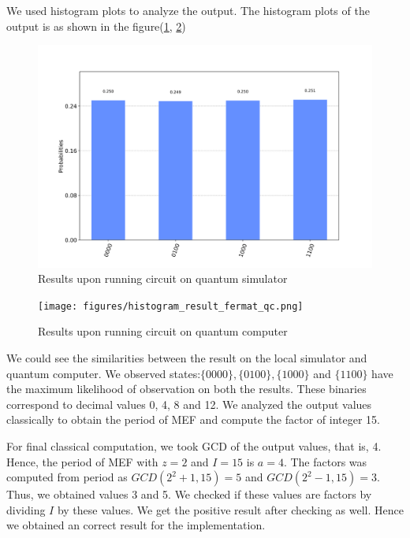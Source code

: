 We used histogram plots to analyze the output. The histogram plots of the output is as shown in the figure(\ref{fig: simulator result}, \ref{fig: quantum result})

\begin{figure}[ht]
    \centering
    \includegraphics[width=\linewidth]{figures/histogram_result_fermat_sim.png}
  \caption{Results upon running circuit on quantum simulator }
  \label{fig: simulator result}
\end{figure}
\begin{figure}[ht]
    \centering
    \texttt{[image: figures/histogram\_result\_fermat\_qc.png]}
  \caption{Results upon running circuit on quantum computer}
  \label{fig: quantum result}
\end{figure}

We could see the similarities between the result on the local simulator and quantum computer. We observed states:$\{0000\},\{0100\},\{1000\}$ and $\{1100\}$ have the maximum likelihood of observation on both the results. These binaries correspond to decimal values 0, 4, 8 and 12. We analyzed the output values classically to obtain the period of MEF and compute the factor of integer 15. 

For final classical computation, we took GCD of the output values, that is, 4. Hence, the period of MEF with $z=2$ and $I=15$ is $a=4$.
The factors was computed from period as $GCD(2^2+1,15) = 5$ and $GCD(2^2-1,15) = 3$. Thus, we obtained values 3 and 5. We checked if these values are factors by dividing $I$ by these values. We get the positive result after checking as well. Hence we obtained an correct result for the implementation.